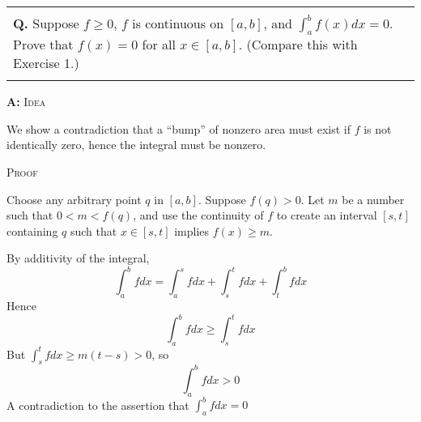 \documentclass{article}
\newenvironment{myboxed}{\noindent\begin{tabular}{|p{.975\linewidth}|}\hline \\}{\\\\\hline\end{tabular}}
\newcounter{Question}
\newenvironment{Question} 
{\bigskip\begin{myboxed}\refstepcounter{Question}\par\noindent\textbf{Q\theQuestion.}}
{\end{myboxed}\bigskip}
\newenvironment{Answer} {\par\noindent\textbf{A:}} {}
\begin{document}
\begin{Question}
    Suppose $f \geq 0$, $f$ is continuous on $[a,b]$, and $\int_a^b f(x)dx = 0$. Prove that $f(x) = 0$ for all $x \in [a, b]$. (Compare this with Exercise 1.)
\end{Question}
\begin{Answer}
    \textsc{Idea}

    We show a contradiction that a ``bump'' of nonzero area must exist if $f$ is not identically zero, hence the integral must be nonzero.

    \textsc{Proof}
    
    Choose any arbitrary point $q$ in $[a, b]$. Suppose $f(q) > 0$. Let $m$ be a number such that $0 < m < f(q)$, and use the continuity of $f$ to create an interval $[s, t]$ containing $q$ such that $x \in [s, t]$ implies $f(x) \geq m$. 

    By additivity of the integral,
    \[\int_a^b f dx = \int_a^s f dx + \int_s^t f dx + \int_t^b f dx\]
    Hence
    \[\int_a^b f dx \geq \int_s^t f dx \]
    But $\int_s^t f dx \geq m(t-s) > 0$, so
    \[\int_a^b f dx > 0\]
    A contradiction to the assertion that $\int_a^b fdx = 0$
\end{Answer}
\end{document}
